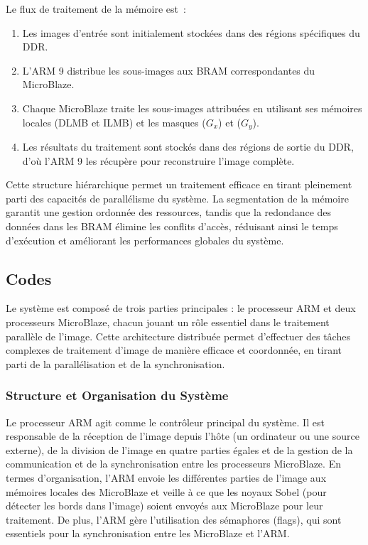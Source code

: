 \documentclass[../CSC_5RO07_TA.tex]{subfiles}
\begin{document}
Le flux de traitement de la mémoire est :

\begin{enumerate}
    \item Les images d'entrée sont initialement stockées dans des régions spécifiques du DDR.
    \item L'ARM 9 distribue les sous-images aux BRAM correspondantes du MicroBlaze.
    \item Chaque MicroBlaze traite les sous-images attribuées en utilisant ses mémoires locales (DLMB et ILMB) et les masques ($G_x$) et ($G_y$).
    \item Les résultats du traitement sont stockés dans des régions de sortie du DDR, d'où l'ARM 9 les récupère pour reconstruire l'image complète.
\end{enumerate}

\vspace{1em} 

Cette structure hiérarchique permet un traitement efficace en tirant pleinement parti des capacités de parallélisme du système. La segmentation de la mémoire garantit une gestion ordonnée des ressources, tandis que la redondance des données dans les BRAM élimine les conflits d'accès, réduisant ainsi le temps d'exécution et améliorant les performances globales du système.

\subsection{Codes}

Le système est composé de trois parties principales : le processeur ARM et deux processeurs MicroBlaze, chacun jouant un rôle essentiel dans le traitement parallèle de l'image. Cette architecture distribuée permet d'effectuer des tâches complexes de traitement d'image de manière efficace et coordonnée, en tirant parti de la parallélisation et de la synchronisation.

\subsubsection{Structure et Organisation du Système}
Le processeur ARM agit comme le contrôleur principal du système. Il est responsable de la réception de l'image depuis l'hôte (un ordinateur ou une source externe), de la division de l'image en quatre parties égales et de la gestion de la communication et de la synchronisation entre les processeurs MicroBlaze. En termes d'organisation, l'ARM envoie les différentes parties de l'image aux mémoires locales des MicroBlaze et veille à ce que les noyaux Sobel (pour détecter les bords dans l'image) soient envoyés aux MicroBlaze pour leur traitement. De plus, l'ARM gère l'utilisation des sémaphores (flags), qui sont essentiels pour la synchronisation entre les MicroBlaze et l'ARM.
\end{document}
